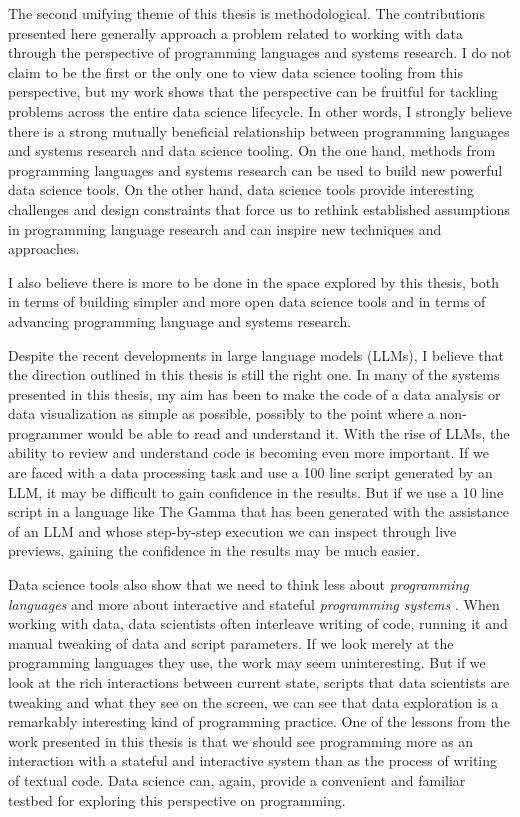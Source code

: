 \documentclass[fleqn,11pt]{report}
\theoremstyle{definition}
\begin{document}
The second unifying theme of this thesis is methodological. The contributions presented here
generally approach a problem related to working with data through the perspective
of programming languages and systems research. I do not claim to be the first or the only one
to view data science tooling from this perspective, but my work shows that the perspective can
be fruitful for tackling problems across the entire data science lifecycle. In other words,
I strongly believe there is a strong mutually beneficial relationship between programming
languages and systems research and data science tooling. On the one hand, methods from
programming languages and systems research can be used to build new powerful data science tools.
On the other hand, data science tools provide interesting challenges and design constraints that
force us to rethink established assumptions in programming language research and can inspire new
techniques and approaches.

I also believe there is more to be done in the space explored by this thesis, both in terms
of building simpler and more open data science tools and in terms of advancing programming
language and systems research.

Despite the recent developments in large language models (LLMs), I believe that the
direction outlined in this thesis is still the right one. In many of the systems presented
in this thesis, my aim has been to make the code of a data analysis or data visualization
as simple as possible, possibly to the point where a non-programmer would be able to read
and understand it. With the rise of LLMs, the ability to review and understand code is
becoming even more important. If we are faced with a data processing task and use a 100 line
script generated by an LLM, it may be difficult to gain confidence in the results. But if
we use a 10 line script in a language like The Gamma that has been generated with the assistance
of an LLM and whose step-by-step execution we can inspect through live previews, gaining the
confidence in the results may be much easier.

Data science tools also show that we need to think less about \emph{programming languages}
and more about interactive and stateful \emph{programming systems} \citep{jakubovic-2023-techdims}.
When working with data, data scientists often interleave writing of code, running it and
manual tweaking of data and script parameters. If we look merely at the programming languages
they use, the work may seem uninteresting. But if we look at the rich interactions between
current state, scripts that data scientists are tweaking and what they see on the screen,
we can see that data exploration is a remarkably interesting kind of programming practice.
One of the lessons from the work presented in this thesis is that we should see programming
more as an interaction with a stateful and interactive system than as the process of writing
of textual code. Data science can, again, provide a convenient and familiar testbed for
exploring this perspective on programming.



%

\end{document}

